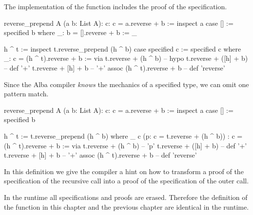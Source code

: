 The implementation of the function includes the proof of the specification.

\begin{alba}
  reverse_prepend A (a b: List A): {c: c = a.reverse + b} :=
    inspect a case
      [] :=
        specified b where
          _: b = [].reverse + b := _

      h ^ t :=
        inspect t.reverse_prepend (h ^ b) case
          specified c :=
            specified c where
              _: c = (h ^ t).reverse + b :=
                via t.reverse + (h ^ b)      -- hypo
                    t.reverse + ([h] + b)    -- def '+'
                    t.reverse + [h] + b      -- '+' assoc
                    (h ^ t).reverse + b      -- def 'reverse'
\end{alba}


Since the Alba compiler \emph{knows} the mechanics of a specified type, we can
omit one pattern match.

\begin{alba}
  reverse_prepend A (a b: List A): {c: c = a.reverse + b} :=
    inspect a case
      [] :=
        specified b

      h ^ t :=
        t.reverse_prepend (h ^ b) where
          _ c (p: c = t.reverse + (h ^ b))
            : c = (h ^ t).reverse + b :=
             via t.reverse + (h ^ b)      -- 'p'
                 t.reverse + ([h] + b)    -- def '+'
                 t.reverse + [h] + b      -- '+' assoc
                 (h ^ t).reverse + b      -- def 'reverse'
\end{alba}

In this definition we give the compiler a hint on how to transform a proof of
the specification of the recursive call into a proof of the specification of
the outer call.

In the runtime all specifications and proofs are erased. Therefore the
definition of the function  in this chapter and the
previous chapter are identical in the runtime.









